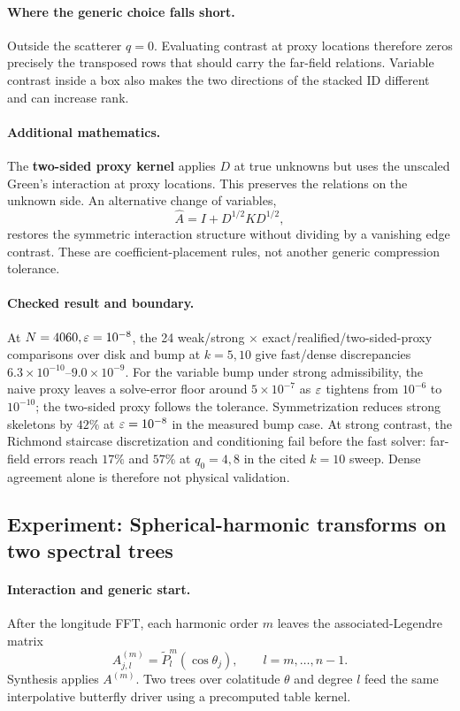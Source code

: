 \paragraph{Where the generic choice falls short.} Outside the scatterer $q=0$. Evaluating contrast at proxy locations therefore zeros precisely the transposed rows that should carry the far-field relations. Variable contrast inside a box also makes the two directions of the stacked ID different and can increase rank.

\paragraph{Additional mathematics.} The \textbf{two-sided proxy kernel} applies $D$ at true unknowns but uses the unscaled Green's interaction at proxy locations. This preserves the relations on the unknown side. An alternative change of variables,
\[
 \widehat A=I+D^{1/2}KD^{1/2},
\]
restores the symmetric interaction structure without dividing by a vanishing edge contrast. These are coefficient-placement rules, not another generic compression tolerance.

\paragraph{Checked result and boundary.} At $N=4060,\varepsilon=10^{-8}$, the 24 weak/strong $\times$ exact/realified/two-sided-proxy comparisons over disk and bump at $k=5,10$ give fast/dense discrepancies $6.3\times10^{-10}$--$9.0\times10^{-9}$. For the variable bump under strong admissibility, the naive proxy leaves a solve-error floor around $5\times10^{-7}$ as $\varepsilon$ tightens from $10^{-6}$ to $10^{-10}$; the two-sided proxy follows the tolerance. Symmetrization reduces strong skeletons by $42\%$ at $\varepsilon=10^{-8}$ in the measured bump case. At strong contrast, the Richmond staircase discretization and conditioning fail before the fast solver: far-field errors reach $17\%$ and $57\%$ at $q_0=4,8$ in the cited $k=10$ sweep. Dense agreement alone is therefore not physical validation.

\subsection{Experiment: Spherical-harmonic transforms on two spectral trees}
\label{exp:e10}
\paragraph{Interaction and generic start.} After the longitude FFT, each harmonic order $m$ leaves the associated-Legendre matrix
\[
 A^{(m)}_{j,l}=\widetilde P_l^m(\cos\theta_j),\qquad l=m,\ldots,n-1.
\]
Synthesis applies $A^{(m)}$. Two trees over colatitude $\theta$ and degree $l$ feed the same interpolative butterfly driver using a precomputed table kernel.

